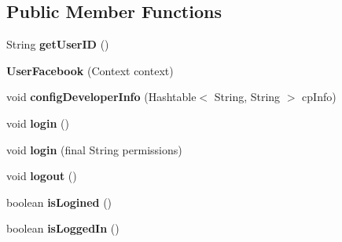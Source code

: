 \subsection*{Public Member Functions}
\begin{DoxyCompactItemize}
\item 
\mbox{\label{classorg_1_1cocos2dx_1_1plugin_1_1UserFacebook_a4073a28259e6aa1d0011bcb08d531e17}} 
String {\bfseries get\+User\+ID} ()
\item 
\mbox{\label{classorg_1_1cocos2dx_1_1plugin_1_1UserFacebook_a1f86ae29f0d9ee33dacd1aa9d4dcbd3f}} 
{\bfseries User\+Facebook} (Context context)
\item 
\mbox{\label{classorg_1_1cocos2dx_1_1plugin_1_1UserFacebook_aa9445c3fe7e71733db559736c4ccf4a8}} 
void {\bfseries config\+Developer\+Info} (Hashtable$<$ String, String $>$ cp\+Info)
\item 
\mbox{\label{classorg_1_1cocos2dx_1_1plugin_1_1UserFacebook_a088080deea76795a10927b2e8ce76d6f}} 
void {\bfseries login} ()
\item 
\mbox{\label{classorg_1_1cocos2dx_1_1plugin_1_1UserFacebook_a8a77741bc58da07c35c4099210413f74}} 
void {\bfseries login} (final String permissions)
\item 
\mbox{\label{classorg_1_1cocos2dx_1_1plugin_1_1UserFacebook_ab9ac9afbadfbcf235dea2cc2549f319f}} 
void {\bfseries logout} ()
\item 
\mbox{\label{classorg_1_1cocos2dx_1_1plugin_1_1UserFacebook_a789341be5b4e822de1715780b5b7de34}} 
boolean {\bfseries is\+Logined} ()
\item 
\mbox{\label{classorg_1_1cocos2dx_1_1plugin_1_1UserFacebook_a99685287306853ee708895a977c0b11e}} 
boolean {\bfseries is\+Logged\+In} ()
\item 
\mbox{\label{classorg_1_1cocos2dx_1_1plugin_1_1UserFacebook_ada457b9509817d619d57a43aa20c0794}} 

\end{DoxyCompactItemize}
